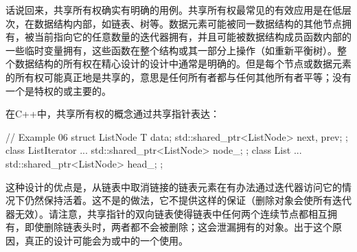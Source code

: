 话说回来，共享所有权确实有明确的用例。共享所有权最常见的有效应用是在低层次，在数据结构内部，如链表、树等。数据元素可能被同一数据结构的其他节点拥有，被当前指向它的任意数量的迭代器拥有，并且可能被数据结构成员函数内部的一些临时变量拥有，这些函数在整个结构或其一部分上操作（如重新平衡树）。整个数据结构的所有权在精心设计的设计中通常是明确的。但是每个节点或数据元素的所有权可能真正地是共享的，意思是任何所有者都与任何其他所有者平等；没有一个是特权的或主要的。

在C++中，共享所有权的概念通过共享指针表达：

\begin{code}
// Example 06
struct ListNode {
  T data;
  std::shared_ptr<ListNode> next, prev;
};
class ListIterator {
  ...
  std::shared_ptr<ListNode> node_;
};
class List {
  ...
  std::shared_ptr<ListNode> head_;
};
\end{code}

这种设计的优点是，从链表中取消链接的链表元素在有办法通过迭代器访问它的情况下仍然保持活着。这不是的做法，它不提供这样的保证（删除对象会使所有迭代器无效）。请注意，共享指针的双向链表使得链表中任何两个连续节点都相互拥有，即使删除链表头时，两者都不会被删除；这会泄漏拥有的对象。出于这个原因，真正的设计可能会为或中的一个使用。

